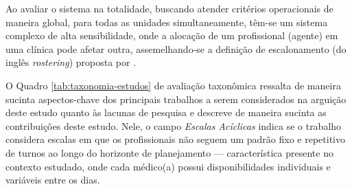 Ao avaliar o sistema na totalidade, buscando atender critérios operacionais de maneira global, para todas as unidades simultaneamente, têm-se um sistema complexo de alta sensibilidade, onde a alocação de um profissional (agente) em uma clínica pode afetar outra, assemelhando-se a definição de escalonamento (do inglês \textit{rostering}) proposta por \cite{Wren_1996}.

O Quadro \ref{tab:taxonomia-estudos} de avaliação taxonômica ressalta de maneira sucinta aspectos-chave dos principais trabalhos a serem considerados na arguição deste estudo quanto às lacunas de pesquisa e descreve de maneira sucinta as contribuições deste estudo. Nele, o campo \textit{Escalas Acíclicas} indica se o trabalho considera escalas em que os profissionais não seguem um padrão fixo e repetitivo de turnos ao longo do horizonte de planejamento — característica presente no contexto estudado, onde cada médico(a) possui disponibilidades individuais e variáveis entre os dias.


